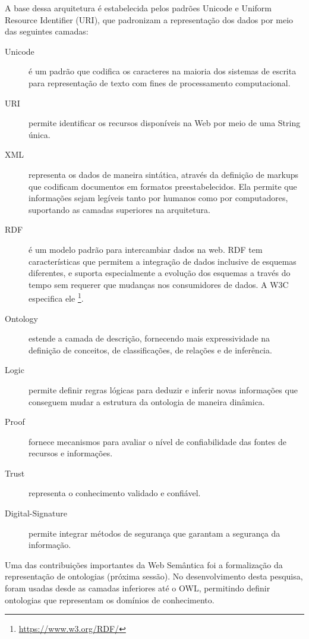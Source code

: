 A base dessa arquitetura é estabelecida pelos padrões \foreignlanguage{english}{Unicode}
e \foreignlanguage{english}{Uniform Resource Identifier} (URI),
que padronizam a representação dos dados por meio das seguintes camadas: 
%
\begin{description}
\item [{Unicode}] \foreignlanguage{brazil}{é um padrão que codifica os
caracteres na maioria dos sistemas de escrita para representação de
texto com fines de processamento computacional.}
\item [{URI}] \foreignlanguage{brazil}{permite identificar os recursos
disponíveis na Web por meio de uma }String\foreignlanguage{brazil}{
única.}
\item [{XML}] \foreignlanguage{brazil}{representa os dados de maneira sintática,
através da definição de }markups\foreignlanguage{brazil}{ que codificam
documentos em formatos preestabelecidos. Ela permite que informações
sejam legíveis tanto por humanos como por computadores, suportando
as camadas superiores na arquitetura.}
\item [{RDF}] \foreignlanguage{brazil}{é um modelo padrão para intercambiar
dados na web. }RDF\foreignlanguage{brazil}{ tem características que
permitem a integração de dados inclusive de esquemas diferentes, e
suporta especialmente a evolução dos esquemas a través do tempo sem
requerer que mudanças nos consumidores de dados. A W3C especifica
ele }\footnote{%
\url{https://www.w3.org/RDF/}%
}\foreignlanguage{brazil}{.}
\item [{Ontology}] \foreignlanguage{brazil}{estende a camada de descrição,
fornecendo mais expressividade na definição de conceitos, de classificações,
de relações e de inferência.}
\item [{Logic}] \foreignlanguage{brazil}{permite definir regras lógicas
para deduzir e inferir novas informações que conseguem mudar a estrutura
da ontologia de maneira dinâmica.}
\item [{Proof}] \foreignlanguage{brazil}{fornece mecanismos para avaliar
o nível de confiabilidade das fontes de recursos e informações.}
\item [{Trust}] \foreignlanguage{brazil}{representa o conhecimento validado
e confiável.}
\item [{Digital-Signature}] \foreignlanguage{brazil}{permite integrar métodos
de segurança que garantam a segurança da informação.}
\end{description}
%
Uma das contribuições importantes da Web Semântica foi a formalização
da representação de ontologias (próxima sessão). No desenvolvimento
desta pesquisa, foram usadas desde as camadas inferiores até o \foreignlanguage{english}{OWL},
permitindo definir ontologias que representam os domínios de conhecimento.

